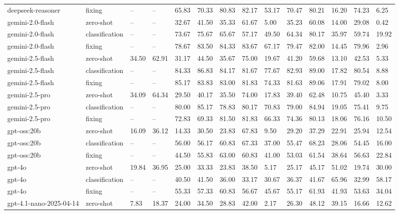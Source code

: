 \begin{table}[!t]
\begin{tabular}{llllllllllllll}
deepseek-reasoner & fixing & -- & -- & 65.83 & 70.33 & 80.83 & 82.17 & 53.17 & 70.47 & 80.21 & 16.20 & 74.23 & 6.25 \\
gemini-2.0-flash & zero-shot & -- & -- & 32.67 & 41.50 & 35.33 & 61.67 & 5.00 & 35.23 & 60.08 & 14.00 & 29.08 & 0.42 \\
gemini-2.0-flash & classification & -- & -- & 73.67 & 75.67 & 65.67 & 57.17 & 49.50 & 64.34 & 80.17 & 35.97 & 59.74 & 19.92 \\
gemini-2.0-flash & fixing & -- & -- & 78.67 & 83.50 & 84.33 & 83.67 & 67.17 & 79.47 & 82.00 & 14.45 & 79.96 & 2.96 \\
gemini-2.5-flash & zero-shot & 34.50 & 62.91 & 31.17 & 44.50 & 35.67 & 75.00 & 19.67 & 41.20 & 59.68 & 13.10 & 42.53 & 5.33 \\
gemini-2.5-flash & classification & -- & -- & 84.33 & 86.83 & 84.17 & 81.67 & 77.67 & 82.93 & 89.00 & 17.82 & 80.54 & 8.88 \\
gemini-2.5-flash & fixing & -- & -- & 85.17 & 83.83 & 83.00 & 81.83 & 74.33 & 81.63 & 89.06 & 17.91 & 79.02 & 8.00 \\
gemini-2.5-pro & zero-shot & 34.09 & 64.34 & 29.50 & 40.17 & 35.50 & 74.00 & 17.83 & 39.40 & 62.48 & 10.75 & 45.40 & 3.33 \\
gemini-2.5-pro & classification & -- & -- & 80.00 & 85.17 & 78.83 & 80.17 & 70.83 & 79.00 & 84.94 & 19.05 & 75.41 & 9.75 \\
gemini-2.5-pro & fixing & -- & -- & 72.83 & 69.33 & 81.50 & 81.83 & 66.33 & 74.36 & 80.13 & 18.06 & 76.16 & 10.50 \\
gpt-oss:20b & zero-shot & 16.09 & 36.12 & 14.33 & 30.50 & 23.83 & 67.83 & 9.50 & 29.20 & 37.29 & 22.91 & 25.94 & 12.54 \\
gpt-oss:20b & classification & -- & -- & 56.00 & 56.17 & 60.83 & 67.33 & 37.00 & 55.47 & 68.23 & 28.06 & 54.45 & 16.00 \\
gpt-oss:20b & fixing & -- & -- & 44.50 & 55.83 & 63.00 & 60.83 & 41.00 & 53.03 & 61.54 & 38.64 & 56.63 & 22.84 \\
gpt-4o & zero-shot & 19.84 & 36.95 & 25.00 & 33.33 & 23.83 & 38.50 & 5.17 & 25.17 & 45.17 & 51.02 & 19.74 & 30.00 \\
gpt-4o & classification & -- & -- & 40.50 & 41.50 & 36.00 & 33.17 & 30.67 & 36.37 & 41.67 & 65.96 & 32.99 & 58.17 \\
gpt-4o & fixing & -- & -- & 55.33 & 57.33 & 60.83 & 56.67 & 45.67 & 55.17 & 61.93 & 41.93 & 53.63 & 34.04 \\
gpt-4.1-nano-2025-04-14 & zero-shot & 7.83 & 18.37 & 24.00 & 34.50 & 28.83 & 42.00 & 2.17 & 26.30 & 48.12 & 39.15 & 16.66 & 12.62 \\

\end{tabular}
\end{table}
